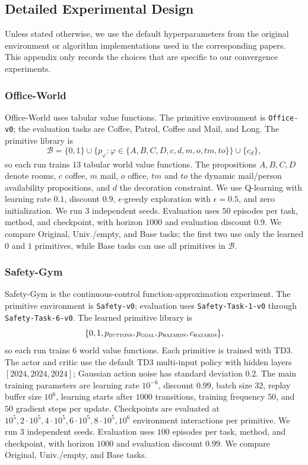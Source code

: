 \subsection{Detailed Experimental Design}
\label{app:detailed-experimental-design}

Unless stated otherwise, we use the default hyperparameters from the original
environment or algorithm implementations used in the corresponding papers.
This appendix only records the choices that are specific to our convergence
experiments.

\subsubsection{Office-World}
\label{app:design-office}

Office-World uses tabular value functions.
The primitive environment is \texttt{Office-v0}; the evaluation tasks are Coffee, Patrol, Coffee and Mail, and Long.
The primitive library is
\[
    \mathcal{B}
    =
    \{0,1\}
    \cup
    \{p_\varphi:\varphi\in\{A,B,C,D,c,d,m,o,tm,to\}\}
    \cup
    \{c_d\},
\]
so each run trains $13$ tabular world value functions.
The propositions $A,B,C,D$ denote rooms, $c$ coffee, $m$ mail, $o$ office, $tm$ and $to$ the dynamic mail/person availability propositions, and $d$ the decoration constraint.
We use Q-learning with learning rate $0.1$, discount $0.9$, $\epsilon$-greedy exploration with $\epsilon=0.5$, and zero initialization.
We run $3$ independent seeds.
Evaluation uses $50$ episodes per task, method, and checkpoint, with horizon $1000$ and evaluation discount $0.9$.
We compare Original, Univ./empty, and Base tasks; the first two use only the learned $0$ and $1$ primitives, while Base tasks can use all primitives in $\mathcal{B}$.

\subsubsection{Safety-Gym}
\label{app:design-safety-gym}

Safety-Gym is the continuous-control function-approximation experiment.
The primitive environment is \texttt{Safety-v0}; evaluation uses \texttt{Safety-Task-1-v0} through \texttt{Safety-Task-6-v0}.
The learned primitive library is
\[
    \{0,1,p_{\textsc{buttons}},p_{\textsc{goal}},
    p_{\textsc{hazards}},c_{\textsc{hazards}}\},
\]
so each run trains $6$ world value functions.
Each primitive is trained with TD3.
The actor and critic use the default TD3 multi-input policy with hidden layers $[2024,2024,2024]$; Gaussian action noise has standard deviation $0.2$.
The main training parameters are learning rate $10^{-6}$, discount $0.99$, batch size $32$, replay buffer size $10^6$, learning starts after $1000$ transitions, training frequency $50$, and $50$ gradient steps per update.
Checkpoints are evaluated at $10^5,2\cdot10^5,4\cdot10^5,6\cdot10^5,8\cdot10^5,10^6$ environment interactions per primitive.
We run $3$ independent seeds.
Evaluation uses $100$ episodes per task, method, and checkpoint, with horizon $1000$ and evaluation discount $0.99$.
We compare Original, Univ./empty, and Base tasks.

